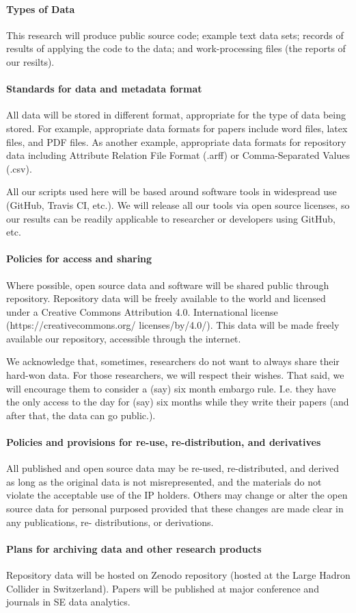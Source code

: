 \paragraph{Types of Data}
This research will produce public source code; example text data sets; records of results of applying the code to the data; and work-processing files (the reports of our resilts).
\vspace{8pt}

\paragraph{Standards for data and metadata format}
All data will be stored in different format, appropriate for the type of data being stored. For example, appropriate data formats for papers include word files, latex files, and PDF files. As another example, appropriate data formats for repository data including Attribute Relation File Format (.arff) or Comma-Separated Values (.csv). 
\vspace{8pt}

\noindent
All our scripts used here will be based around software tools in widespread use (GitHub, Travis CI, etc.). We will release all our tools via open source licenses, so our results can be readily applicable to researcher or developers using GitHub, etc. 
\vspace{8pt}

\paragraph{Policies for access and sharing}
Where possible, open source data and software will be shared public through repository. Repository data will be freely available to the world and licensed under a Creative Commons Attribution 4.0. International license (https://creativecommons.org/ licenses/by/4.0/). This data will be made freely available our repository, accessible through the internet. 
\vspace{8pt}

\noindent
We acknowledge that, sometimes, researchers do not want to always share their hard-won data. For those researchers, we will respect their wishes. That said, we will encourage them to consider a (say) six month embargo rule. I.e. they have the only access to the day for (say) six months while they write their papers (and after that, the data can go public.). 
\vspace{8pt}

\paragraph{Policies and provisions for re-use, re-distribution, and derivatives}
All published and open source data may be re-used, re-distributed, and derived as long as the original data is not misrepresented, and the materials do not violate the acceptable use of the IP holders. Others may change or alter the open source data for personal purposed provided that these changes are made clear in any publications, re- distributions, or derivations. 
\vspace{8pt}

\paragraph{Plans for archiving data and other research products}
Repository data will be hosted on Zenodo repository (hosted at the Large Hadron Collider in Switzerland). Papers will be published at major conference and journals in SE data analytics.